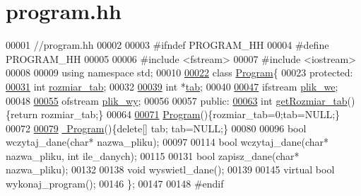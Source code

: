 \hypertarget{program_8hh}{\section{program.\-hh}
\label{program_8hh}
}

\begin{DoxyCode}
00001 \textcolor{comment}{//program.hh}
00002 
00003 \textcolor{preprocessor}{#ifndef PROGRAM\_HH}
00004 \textcolor{preprocessor}{}\textcolor{preprocessor}{#define PROGRAM\_HH}
00005 \textcolor{preprocessor}{}
00006 \textcolor{preprocessor}{#include <fstream>}
00007 \textcolor{preprocessor}{#include <iostream>}
00008 
00009 \textcolor{keyword}{using namespace }std;
00010 
\hypertarget{program_8hh_source_l00022}{}\hyperlink{class_program}{00022} \textcolor{keyword}{class }\hyperlink{class_program}{Program}\{
00023 \textcolor{keyword}{protected}:
\hypertarget{program_8hh_source_l00031}{}\hyperlink{class_program_a3b5a10104019b9daa23ce4a5f5533820}{00031}   \textcolor{keywordtype}{int} \hyperlink{class_program_a3b5a10104019b9daa23ce4a5f5533820}{rozmiar\_tab};
00032 
\hypertarget{program_8hh_source_l00039}{}\hyperlink{class_program_ac72268c925315098b1632cc97d0f818a}{00039}   \textcolor{keywordtype}{int} *\hyperlink{class_program_ac72268c925315098b1632cc97d0f818a}{tab};
00040 
\hypertarget{program_8hh_source_l00047}{}\hyperlink{class_program_aac2f72538e24e533c327fe5546a59210}{00047}   ifstream \hyperlink{class_program_aac2f72538e24e533c327fe5546a59210}{plik\_we};
00048 
\hypertarget{program_8hh_source_l00055}{}\hyperlink{class_program_a59c1761a5ea875b3d5a4678928f3a1de}{00055}   ofstream \hyperlink{class_program_a59c1761a5ea875b3d5a4678928f3a1de}{plik\_wy};
00056 
00057 \textcolor{keyword}{public}:
\hypertarget{program_8hh_source_l00063}{}\hyperlink{class_program_a4fb9c2979a0dca1e14c75f4cc461bebd}{00063}   \textcolor{keywordtype}{int} \hyperlink{class_program_a4fb9c2979a0dca1e14c75f4cc461bebd}{getRozmiar\_tab}()\{\textcolor{keywordflow}{return} rozmiar\_tab;\}
00064 
\hypertarget{program_8hh_source_l00071}{}\hyperlink{class_program_aaefaa0df08f3484476fc4d61e97acbdc}{00071}   \hyperlink{class_program_aaefaa0df08f3484476fc4d61e97acbdc}{Program}()\{rozmiar\_tab=0;tab=NULL;\}
00072 
\hypertarget{program_8hh_source_l00079}{}\hyperlink{class_program_a986aef1c50e1d338a3315a47ba6df549}{00079}   \hyperlink{class_program_a986aef1c50e1d338a3315a47ba6df549}{~Program}()\{\textcolor{keyword}{delete}[] tab; tab=NULL;\}
00080 
00096   \textcolor{keywordtype}{bool} wczytaj\_dane(\textcolor{keywordtype}{char}* nazwa\_pliku);
00097 
00114   \textcolor{keywordtype}{bool} wczytaj\_dane(\textcolor{keywordtype}{char}* nazwa\_pliku, \textcolor{keywordtype}{int} ile\_danych);
00115 
00131  \textcolor{keywordtype}{bool} zapisz\_dane(\textcolor{keywordtype}{char}* nazwa\_pliku);
00132 
00138   \textcolor{keywordtype}{void} wyswietl\_dane();
00139 
00145   \textcolor{keyword}{virtual} \textcolor{keywordtype}{bool} wykonaj\_program();
00146 \};
00147 
00148 \textcolor{preprocessor}{#endif}
\end{DoxyCode}
